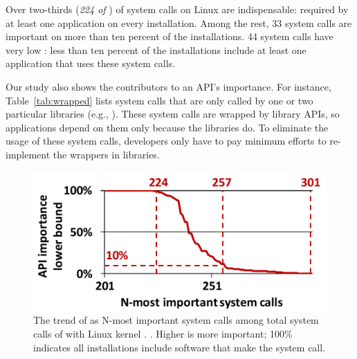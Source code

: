 Over two-thirds ({\em 224 of \syscallnum{}}) 
of system calls on Linux are indispensable:
required by 
at least one application on every installation.
Among the rest, 33 system calls are important on more than ten percent of the installations.
44 system calls have very low \usagemetric{}:
less than ten percent of the installations include at least one application
that uses these system calls.

Our study also shows the contributors
to an API's importance. %
For instance, Table~\ref{tab:wrapped} lists system calls that are
only called by one or two particular libraries
(e.g., \libc{}).
These system calls are wrapped by library APIs,
so applications depend on them only because the libraries do.
To eliminate the usage of these system calls,
developers only have to pay minimum efforts to re-implement the wrappers in libraries.

\begin{figure}[t]
\centering
\includegraphics[width=4.5in]{syspop/figures/syscall-popularity-all-by-inst.pdf}
\caption[N-most important system calls in Linux.]
{The trend of \usagemetric{} as N-most important system calls among total \syscallnum{} system calls of \osversion{} with Linux kernel . .
Higher is more important; 100\% indicates all installations include software that make the system call.}
\label{fig:syscall-popularity-trend}
\end{figure}

